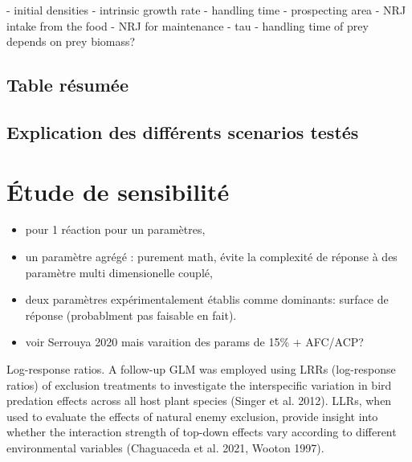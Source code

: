 - initial densities
- intrinsic growth rate
- handling time
- prospecting area
- NRJ intake from the food
- NRJ for maintenance
- tau
- handling time of prey depends on prey biomass?


\subsection{Table résumée}


\subsection{Explication des différents scenarios testés}


\section{Étude de sensibilité }
\begin{itemize}
    \item pour 1 réaction pour un paramètres,
    \item un paramètre agrégé : purement math, évite la complexité de réponse à des paramètre multi dimensionelle couplé,
    \item deux paramètres expérimentalement établis comme dominants: surface de réponse (probablment pas faisable en fait).
    \item voir Serrouya 2020 mais varaition des params de 15\% + AFC/ACP?
\end{itemize}



Log-response ratios. A follow-up GLM was employed using LRRs (log-response ratios) of exclusion treatments to investigate the interspecific variation in bird predation effects across all host plant species (Singer et al. 2012). LLRs, when used to evaluate the effects of natural enemy exclusion, provide insight into whether the interaction strength of top-down effects vary according to different environmental variables (Chaguaceda et al. 2021, Wooton 1997). 